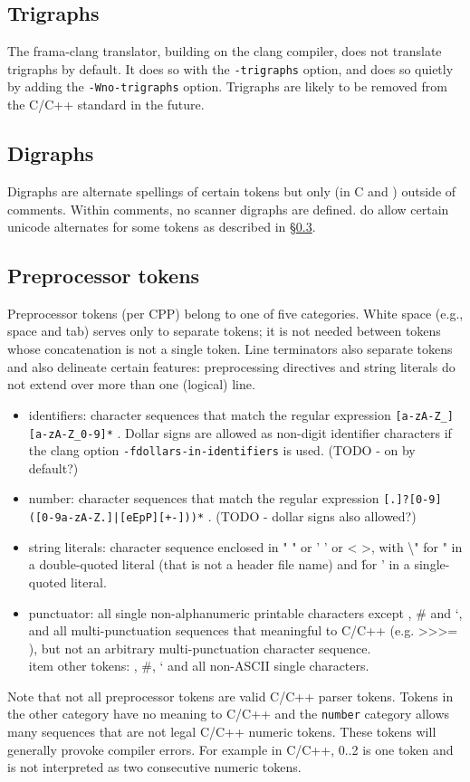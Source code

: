\subsection{Trigraphs}

The frama-clang translator, building on the clang compiler, does not translate 
trigraphs by default. It does so with the \lstinline|-trigraphs| option, and
does so quietly by adding the \lstinline|-Wno-trigraphs| option.
Trigraphs are likely to be removed from the C/C++ standard in the future.


\subsection{Digraphs}
Digraphs are alternate spellings of certain tokens but only (in C and \lang) outside of comments. 
Within \NAME comments, no scanner digraphs are defined. \acslb do allow certain unicode alternates for some tokens as described in \S\ref{sec:tokens}.


\subsection{Preprocessor tokens}
\label{sec:tokens}
Preprocessor tokens (per CPP) belong to one of five categories. White space (e.g., space and tab) serves only to separate tokens; it is not needed between tokens whose concatenation is not a single token. Line terminators also separate tokens and also delineate certain features: preprocessing directives and string literals do not extend over more than one (logical) line.
\begin{itemize}
	\item identifiers: character sequences that match the regular expression \texttt{[a-zA-Z\_][a-zA-Z\_0-9]*} . Dollar signs are allowed as non-digit identifier characters if the clang option \texttt{-fdollars-in-identifiers} is used. (TODO - on by default?)
	\item number: character sequences that match the regular expression \texttt{[.]?[0-9]([0-9a-zA-Z.]|[eEpP][+-]))*} . (TODO - dollar signs also allowed?)
	\item string literals: character sequence enclosed in " " or ' ' or < >, with \textbackslash " for " in a double-quoted literal (that is not a header file name) and \' for ' in a single-quoted literal.
	\item punctuator: all single non-alphanumeric printable characters except \@, \# and `, and all multi-punctuation sequences that meaningful to C/C++ (e.g. >>>= ), but not an arbitrary multi-punctuation character sequence.
	\\item other tokens: \@, \#, ` and all non-ASCII single characters.
\end{itemize}
Note that not all preprocessor tokens are valid C/C++ parser tokens. Tokens in the other category have no meaning to C/C++ and the \texttt{number} category allows many sequences that are not legal C/C++ numeric tokens. These tokens will generally provoke compiler errors. For example in C/C++, 0..2 is one token and is not interpreted as two consecutive numeric tokens.


